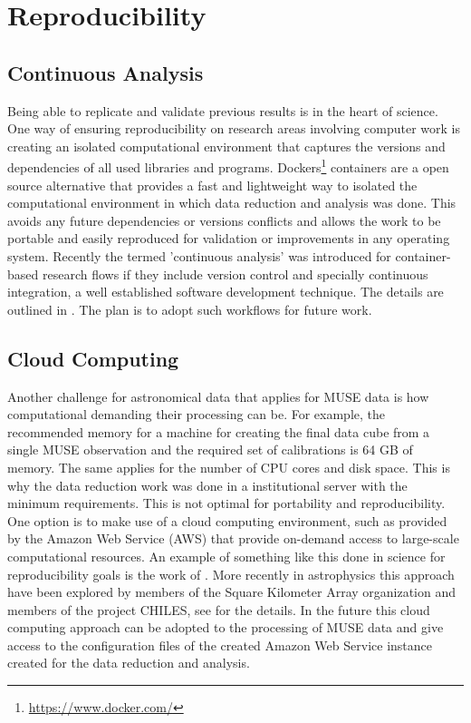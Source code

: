 

\section{Reproducibility}


\subsection{Continuous Analysis}


Being able to replicate and validate previous results is in the heart of science. One way of ensuring reproducibility on research areas involving computer work is creating an isolated computational environment that captures the versions and dependencies of all used libraries and programs. Dockers\footnote{\url{https://www.docker.com/}} containers are a open source alternative that provides a fast and lightweight way to isolated the computational environment in which data reduction and analysis was done. This  avoids any future dependencies or versions conflicts and allows the work to be portable and easily reproduced for validation or improvements in any operating system. Recently the termed 'continuous analysis' was introduced for container-based research flows if they include version control and specially continuous integration, a well established software development technique. The details are outlined in \cite{Beaulieu-Jones056473}. The plan is to adopt such workflows for future work.  

\subsection{Cloud Computing}

Another challenge for astronomical data that applies for MUSE data is how computational demanding their processing can be. For example, the recommended memory for a machine for creating the final data cube from a single MUSE observation and the required set of calibrations is 64 GB of memory. The same applies for the number of CPU cores and disk space. This is why the data reduction work was done in a institutional server with the minimum requirements. This is not optimal for portability and reproducibility. One option is to make use of a cloud computing environment, such as provided by the Amazon Web Service (AWS) that provide on-demand access to large-scale computational resources. An example of something like this done in science for reproducibility goals is the work of \cite{ragan-kelley_collaborative_2013}. More recently in astrophysics this approach have been explored by members of the Square Kilometer Array organization and members of the project CHILES, see \cite{Dodson_SKAAmazon_2016} for the details. In the future this cloud computing approach can be adopted to the processing of MUSE data and give access to the configuration files of the created Amazon Web Service instance created for the data reduction and analysis.  

